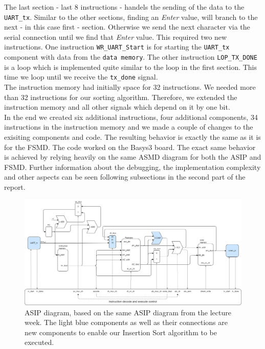 \documentclass[conference]{IEEEtran}
\begin{document}
The last section - last 8 instructions - handels the sending of the data to the \texttt{UART\_tx}. Similar to the other sections, finding an \textit{Enter} value, will branch to the next - in this case first - section. Otherwise we send the next character via the serial connection until we find that \textit{Enter} value. This required two new instructions. One instruction \texttt{WR\_UART\_Start} is for starting the \texttt{UART\_tx} component with data from the \texttt{data memory}. The other instruction \texttt{LOP_TX_DONE} is a loop which is implemented quite similar to the loop in the first section. This time we loop until we receive the \texttt{tx\_done} signal.\\
The instruction memory had initially space for 32 instructions. We needed more than 32 instructions for our sorting algorithm. Therefore, we extended the instruction memory and all other signals which depend on it by one bit. \\
In the end we created six additional instructions, four additional components, 34 instructions in the instruction memory and we made a couple of changes to the exisiting components and code. The resulting behavior is exactly the same as it is for the FSMD. The code worked on the Basys3 board. The exact same behavior is achieved by relying heavily on the same ASMD diagram for both the ASIP and FSMD. Further information about the debugging, the implementation complexity and other aspects can be seen following subsections in the second part of the report. \\

\begin{figure}
    \centering
    \includegraphics[width=1\linewidth]{Images/ASIP.png}
    \caption{ASIP diagram, based on the same ASIP diagram from the lecture week. The light blue components as well as their connections are new components to enable our Insertion Sort algorithm to be executed.}
    \label{fig:asip}
\end{figure}
\end{document}
